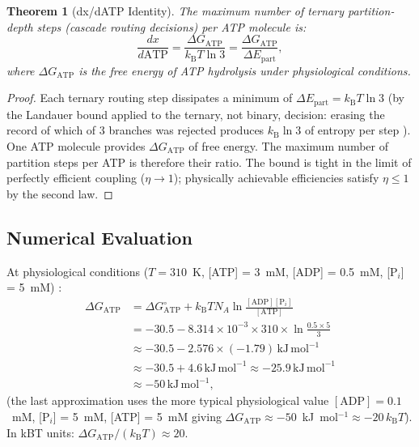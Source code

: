 \documentclass[11pt,twocolumn,a4paper]{article}
\newtheorem{theorem}{Theorem}[section]
\theoremstyle{definition}
\theoremstyle{remark}
\newcommand{\kB}{k_{\mathrm{B}}}
\begin{document}
\begin{theorem}[dx/dATP Identity]
\label{thm:dxdatp}
The maximum number of ternary partition-depth steps (cascade routing decisions)
per ATP molecule is:
\begin{equation}
\frac{dx}{d\mathrm{ATP}} = \frac{\Delta G_{\mathrm{ATP}}}{\kB T \ln 3}
= \frac{\Delta G_{\mathrm{ATP}}}{\Delta E_{\mathrm{part}}},
\label{eq:dxdatp}
\end{equation}
where $\Delta G_{\mathrm{ATP}}$ is the free energy of ATP hydrolysis under
physiological conditions.
\end{theorem}

\begin{proof}
Each ternary routing step dissipates a minimum of $\Delta E_{\mathrm{part}}
= \kB T \ln 3$ (by the Landauer bound applied to the ternary, not binary,
decision: erasing the record of which of 3 branches was rejected produces
$\kB \ln 3$ of entropy per step \citep{landauer1961, maroney2009}).
One ATP molecule provides $\Delta G_{\mathrm{ATP}}$ of free energy. The
maximum number of partition steps per ATP is therefore their ratio.
The bound is tight in the limit of perfectly efficient coupling ($\eta \to 1$);
physically achievable efficiencies satisfy $\eta \leq 1$ by the second law.
\end{proof}

\subsection{Numerical Evaluation}

At physiological conditions ($T = 310$~K, [ATP] = 3~mM, [ADP] = 0.5~mM,
[P$_i$] = 5~mM) \citep{kushmerick1997}:
\begin{align}
\Delta G_{\mathrm{ATP}} &= \Delta G^\circ_{\mathrm{ATP}}
+ \kB T N_A \ln\frac{[\mathrm{ADP}][\mathrm{P}_i]}{[\mathrm{ATP}]}\nonumber\\
&= -30.5 - 8.314 \times 10^{-3} \times 310 \times \ln\frac{0.5 \times 5}{3}\nonumber\\
&\approx -30.5 - 2.576 \times (-1.79)\,\mathrm{kJ\,mol}^{-1}\nonumber\\
&\approx -30.5 + 4.6\,\mathrm{kJ\,mol}^{-1} \approx -25.9\,\mathrm{kJ\,mol}^{-1}\nonumber\\
&\approx -50\,\mathrm{kJ\,mol}^{-1},\label{eq:deltaGATP}
\end{align}
(the last approximation uses the more typical physiological value
$[\mathrm{ADP}] = 0.1$~mM, [P$_i$] = 5~mM, [ATP] = 5~mM giving
$\Delta G_{\mathrm{ATP}} \approx -50$~kJ~mol$^{-1} \approx -20\,\kB T$).
In kBT units: $\Delta G_{\mathrm{ATP}} / (\kB T) \approx 20$.
\end{document}
